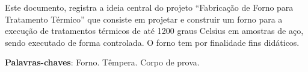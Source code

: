 \begin{resumo}
Este documento, registra a ideia central do projeto “Fabricação de Forno para Tratamento Térmico” que consiste em projetar e construir um forno para a execução de tratamentos térmicos de até 1200 graus Celsius em amostras de aço, sendo executado de forma controlada. O forno tem por finalidade fins didáticos.

 \vspace{\onelineskip}

 \noindent
 \textbf{Palavras-chaves}: Forno. Têmpera. Corpo de prova.
\end{resumo}
